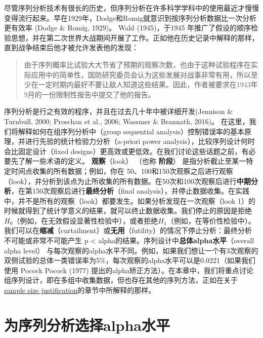 \documentclass[
  letterpaper,
  DIV=11,
  numbers=noendperiod]{scrreprt}
\begin{document}
尽管序列分析技术有很长的历史，但序列分析在许多科学学科中的使用最近才慢慢变得流行起来。早在1929年，Dodge和Romig就意识到按序列分析数据比一次分析更有效率
(Dodge \& Romig, 1929)。 Wald (1945)，于1945
年推广了假设的顺序检验思想，并在第二次世界大战期间开展了工作。正如他在历史记录中解释的那样，直到战争结束后他才被允许发表他的发现：

\begin{quote}
由于序列概率比试验大大节省了预期的观察次数，也由于这种试验程序在实际应用中的简单性，国防研究委员会认为这些发展对战事非常有用，所以至少在一定时期内最好不要让敌人知道这些结果。因此，作者被要求在1943年9月的一份限制性报告中提交了他的报告。
\end{quote}

序列分析是行之有效的程序，并且在过去几十年中被详细开发(Jennison \&
Turnbull, 2000; Proschan et al., 2006; Wassmer \& Brannath, 2016)。
在这里，我们将解释如何在组序列分析中（group sequential
analysis）控制错误率的基本原理，并进行先验的统计检验力分析（a-priori
power analysis），比较序列设计何时会比固定设计（fixed
designs）更高效或更低效。在我们讨论这些话题之前，有必要先了解一些术语的定义。
\textbf{观察}（look） （也称 \textbf{阶段}）
是指分析截止至某一特定时间点收集的所有数据；例如，你在
50、100和150次观察之后进行观察（look），并分析到该点为止所收集的所有数据。在50次和100次观察后进行\textbf{中期分析}，在第150次观察后进行\textbf{最终分析}（final
analysis），并停止数据收集。在实践中，并不是所有的观察（look）都要发生。如果分析发现在一次观察（look
1）的时候就得到了统计学意义的结果，就可以终止数据收集。我们停止的原因是拒绝\(H_0\)（例如，在无效假设显著性检验中），或者拒绝\(H_1\)（例如，在等价性检验中）。我们可以在\textbf{缩减}（curtailment）或\textbf{无用}（futility）的情况下停止分析：最终分析不可能或非常不可能产生
p \textless{} alpha的结果。序列设计中\textbf{总体alpha水平}（overall
alpha level）
与每次观察的alpha水平不同。例如，如果我们想让一个有3次观察的双侧试验的总体一类错误率为5\%，每次观察的alpha水平可以是0.0221（如果我们使用
Pocock Pocock (1977)
提出的alpha矫正方法）。在本章中，我们将重点讨论组序列设计，即在多组中收集数据，但也存在其他的序列方法，正如在关于
\protect\hyperlink{sequentialsamplesize}{sample size
justification}的章节中所解释的那样。

\hypertarget{ux4e3aux5e8fux5217ux5206ux6790ux9009ux62e9alphaux6c34ux5e73}{%
\section{为序列分析选择alpha水平}\label{ux4e3aux5e8fux5217ux5206ux6790ux9009ux62e9alphaux6c34ux5e73}}
\end{document}
